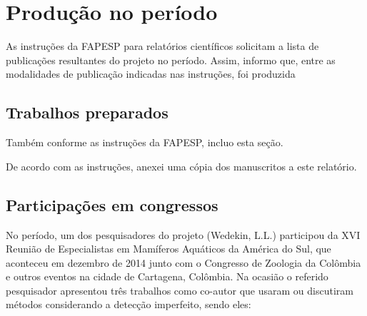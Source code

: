 \section{Produção no período} %
As instruções da FAPESP para relatórios científicos solicitam a lista de publicações resultantes do projeto no período.
Assim, informo que, entre as modalidades de publicação indicadas nas instruções, foi produzida 


\subsection{Trabalhos preparados} %
Também conforme as instruções da FAPESP, incluo esta seção. 


De acordo com as instruções, anexei uma cópia dos manuscritos a este relatório.

\subsection{Participações em congressos} %

No período, um dos pesquisadores do projeto (Wedekin, L.L.) participou da XVI Reunião de Especialistas em Mamíferos Aquáticos da América do Sul, que aconteceu em dezembro de 2014 junto com o Congresso de Zoologia da Colômbia e outros eventos na cidade de Cartagena, Colômbia. Na ocasião o referido pesquisador apresentou três trabalhos como co-autor que usaram ou discutiram métodos considerando a detecção imperfeito, sendo eles:



